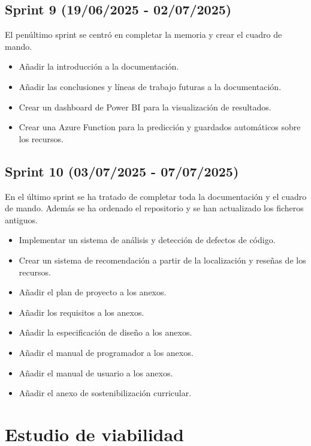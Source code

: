 \subsection{Sprint 9 (19/06/2025 - 02/07/2025)}

El penúltimo sprint se centró en completar la memoria y crear el cuadro de mando.

\begin{itemize}
    \item Añadir la introducción a la documentación.
    \item Añadir las conclusiones y líneas de trabajo futuras a la documentación.
    \item Crear un dashboard de Power BI para la visualización de resultados.
    \item Crear una Azure Function para la predicción y guardados automáticos sobre los recursos.
\end{itemize}

\subsection{Sprint 10 (03/07/2025 - 07/07/2025)}

En el último sprint se ha tratado de completar toda la documentación y el cuadro de mando.
Además se ha ordenado el repositorio y se han actualizado los ficheros antiguos.

\begin{itemize}
    \item Implementar un sistema de análisis y detección de defectos de código.
    \item Crear un sistema de recomendación a partir de la localización y reseñas de los recursos.
    \item Añadir el plan de proyecto a los anexos.
    \item Añadir los requisitos a los anexos.
    \item Añadir la especificación de diseño a los anexos.
    \item Añadir el manual de programador a los anexos.
    \item Añadir el manual de usuario a los anexos.
    \item Añadir el anexo de sostenibilización curricular.
\end{itemize}


\section{Estudio de viabilidad}


